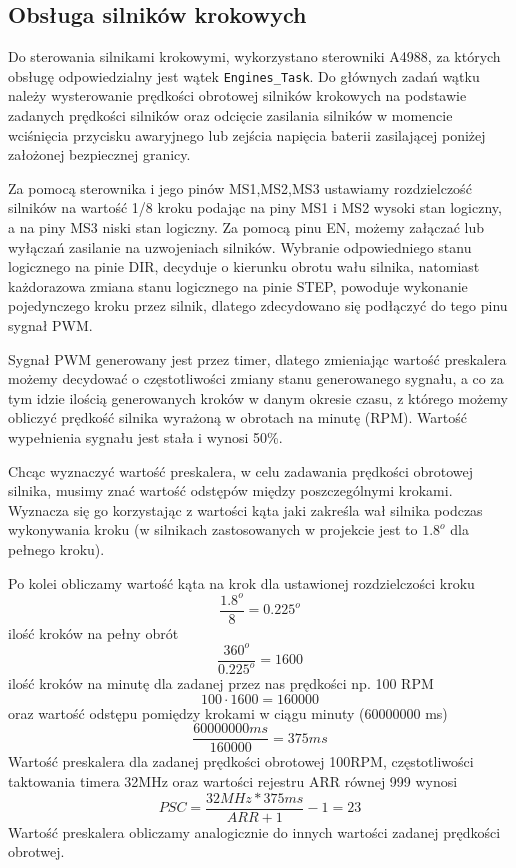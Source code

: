 \newpage
\subsection{Obsługa silników krokowych}

Do sterowania silnikami krokowymi, wykorzystano sterowniki A4988, za których obsługę odpowiedzialny jest wątek \texttt{Engines\_Task}. Do głównych zadań wątku należy wysterowanie prędkości obrotowej silników krokowych na podstawie zadanych prędkości silników oraz odcięcie zasilania silników w momencie wciśnięcia przycisku awaryjnego lub zejścia napięcia baterii zasilającej poniżej założonej bezpiecznej granicy.

Za pomocą sterownika i jego pinów MS1,MS2,MS3 ustawiamy rozdzielczość silników na wartość 1/8 kroku podając na piny MS1 i MS2 wysoki stan logiczny, a na piny MS3 niski stan logiczny. Za pomocą pinu EN, możemy załączać lub wyłączań zasilanie na uzwojeniach silników. Wybranie odpowiedniego stanu logicznego na pinie DIR, decyduje o kierunku obrotu wału silnika, natomiast każdorazowa zmiana stanu logicznego na pinie STEP, powoduje wykonanie pojedynczego kroku przez silnik, dlatego zdecydowano się podłączyć do tego pinu sygnał PWM.

Sygnał PWM generowany jest przez timer, dlatego zmieniając wartość preskalera możemy decydować o częstotliwości zmiany stanu generowanego sygnału, a co za tym idzie ilością generowanych kroków w danym okresie czasu, z którego możemy obliczyć prędkość silnika wyrażoną w obrotach na minutę (RPM). Wartość wypełnienia sygnału jest stała i wynosi 50\%. 

Chcąc wyznaczyć wartość preskalera, w celu zadawania prędkości obrotowej silnika, musimy znać wartość odstępów między poszczególnymi krokami. Wyznacza się go korzystając z wartości kąta jaki zakreśla wał silnika podczas wykonywania kroku (w silnikach zastosowanych w projekcie jest to $1.8^o$ dla pełnego kroku).

Po kolei obliczamy wartość kąta na krok dla ustawionej rozdzielczości kroku
$$
    \frac{1.8^o}{8} = 0.225^o
$$
ilość kroków na pełny obrót
$$
    \frac{360^o}{0.225^o} = 1600
$$
ilość kroków na minutę dla zadanej przez nas prędkości np. 100 RPM
$$
    100 \cdot 1600 = 160000
$$
oraz wartość odstępu pomiędzy krokami w ciągu minuty (60000000 ms)
$$
    \frac{60000000ms}{160000} = 375 ms
$$
Wartość preskalera dla zadanej prędkości obrotowej 100RPM, częstotliwości taktowania timera 32MHz oraz wartości rejestru ARR równej 999 wynosi
$$
    PSC = \frac{32MHz * 375ms}{ARR + 1} - 1 = 23
$$
Wartość preskalera obliczamy analogicznie do innych wartości zadanej prędkości obrotwej.

